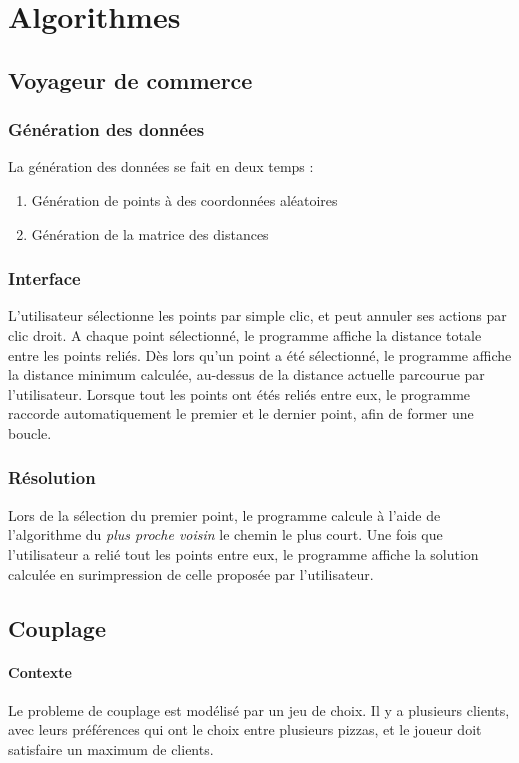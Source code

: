 \section{Algorithmes}
    \subsection{Voyageur de commerce}
        \subsubsection{Génération des données}
            La génération des données se fait en deux temps :
            \begin{enumerate}
                \item Génération de points à des coordonnées aléatoires
                \item Génération de la matrice des distances
            \end{enumerate}
        \subsubsection{Interface}
            L'utilisateur sélectionne les points par simple clic,
            et peut annuler ses actions par clic droit.
            A chaque point sélectionné, le programme
            affiche la distance totale entre les points reliés.
            Dès lors qu'un point a été sélectionné, le programme
            affiche la distance minimum calculée, au-dessus de
            la distance actuelle parcourue par l'utilisateur.
            Lorsque tout les points ont étés reliés entre eux,
            le programme raccorde automatiquement le premier
            et le dernier point, afin de former une boucle.
        \subsubsection{Résolution}
            Lors de la sélection du premier point,
            le programme calcule à l'aide de l'algorithme
            du \emph{plus proche voisin} le chemin le plus court.
            Une fois que l'utilisateur a relié tout les points
            entre eux, le programme affiche la solution calculée
            en surimpression de celle proposée par l'utilisateur.


	\subsection{Couplage}
		\paragraph{Contexte}
			Le probleme de couplage est modélisé par un jeu de choix.
			Il y a plusieurs clients, avec leurs préférences qui ont
			 le choix entre plusieurs pizzas, et le joueur doit 
			 satisfaire un maximum de clients.
